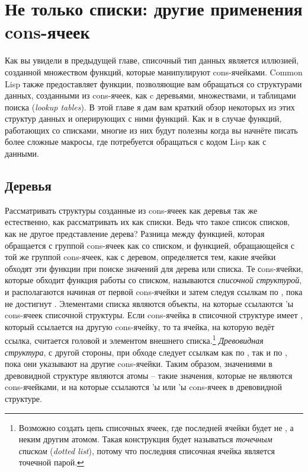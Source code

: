 \chapter{Не только списки: другие применения cons-ячеек}
\label{ch:13}

Как вы увидели в предыдущей главе, списочный тип данных является иллюзией, созданной
множеством функций, которые манипулируют cons-ячейками. Common Lisp также предоставляет
функции, позволяющие вам обращаться со структурами данных, созданными из cons-ячеек, как c
деревьями, множествами, и таблицами поиска (\textit{lookup tables}). В этой главе я дам
вам краткий обзор некоторых из этих структур данных и оперирующих с ними функций. Как и в
случае функций, работающих со списками, многие из них будут полезны когда вы начнёте
писать более сложные макросы, где потребуется обращаться с кодом Lisp как с данными.


\section{Деревья}

Рассматривать структуры созданные из cons-ячеек как деревья так же естественно, как
рассматривать их как списки. Ведь что такое список списков, как не другое представление
дерева?  Разница между функцией, которая обращается с группой cons-ячеек как со списком, и
функцией, обращающейся с той же группой cons-ячеек, как с деревом, определяется тем, какие
ячейки обходят эти функции при поиске значений для дерева или списка. Те сons-ячейки,
которые обходит функция работы со списком, называются \textit{списочной структурой}, и
располагаются начиная от первой cons-ячейки и затем следуя ссылкам по , пока не
достигнут .  Элементами списка являются объекты, на которые ссылаются
'ы cons-ячеек списочной структуры. Если cons-ячейка в списочной структуре имеет
, который ссылается на другую cons-ячейку, то та ячейка, на которую ведёт
ссылка, считается головой и элементом внешнего списка.\footnote{Возможно создать цепь
  списочных ячеек, где  последней ячейки будет не , а неким другим
  атомом. Такая конструкция будет называться \textit{точечным списком} (\textit{dotted
    list}), потому что последняя списочная ячейка является точечной парой.}
\textit{Древовидная структура}, с другой стороны, при обходе следует ссылкам как по
, так и по , пока они указывают на другие cons-ячейки. Таким образом,
значениями в древовидной структуре являются атомы -- такие значения, которые не являются
cons-ячейками, и на которые ссылаются 'ы или 'ы cons-ячеек в
древовидной структуре.

